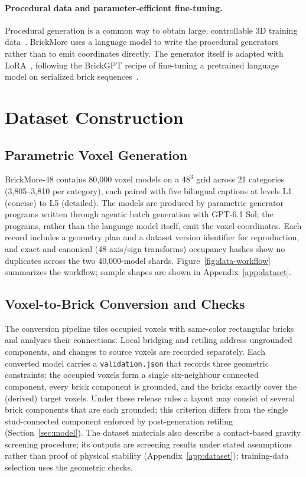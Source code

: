 \documentclass[letterpaper]{article} %
\begin{document}
\paragraph{Procedural data and parameter-efficient fine-tuning.}
Procedural generation is a common way to obtain large, controllable 3D training data~\cite{infinigen}. BrickMore uses a language model to write the procedural generators rather than to emit coordinates directly. The generator itself is adapted with LoRA~\cite{lora}, following the BrickGPT recipe of fine-tuning a pretrained language model on serialized brick sequences~\cite{brickgpt}.

\section{Dataset Construction}
\label{sec:dataset}
\subsection{Parametric Voxel Generation}
BrickMore-48 contains 80,000 voxel models on a $48^3$ grid across 21 categories (3,805--3,810 per category), each paired with five bilingual captions at levels L1 (concise) to L5 (detailed). The models are produced by parametric generator programs written through agentic batch generation with GPT-6.1 Sol; the programs, rather than the language model itself, emit the voxel coordinates. Each record includes a geometry plan and a dataset version identifier for reproduction, and exact and canonical (48 axis/sign transforms) occupancy hashes show no duplicates across the two 40,000-model shards. Figure~\ref{fig:data-workflow} summarizes the workflow; sample shapes are shown in Appendix~\ref{app:dataset}.


\subsection{Voxel-to-Brick Conversion and Checks}
The conversion pipeline tiles occupied voxels with same-color rectangular bricks and analyzes their connections. Local bridging and retiling address ungrounded components, and changes to source voxels are recorded separately. Each converted model carries a \texttt{validation.json} that records three geometric constraints: the occupied voxels form a single six-neighbour connected component, every brick component is grounded, and the bricks exactly cover the (derived) target voxels. Under these release rules a layout may consist of several brick components that are each grounded; this criterion differs from the single stud-connected component enforced by post-generation retiling (Section~\ref{sec:model}). The dataset materials also describe a contact-based gravity screening procedure; its outputs are screening results under stated assumptions rather than proof of physical stability (Appendix~\ref{app:dataset}); training-data selection uses the geometric checks.
\end{document}
